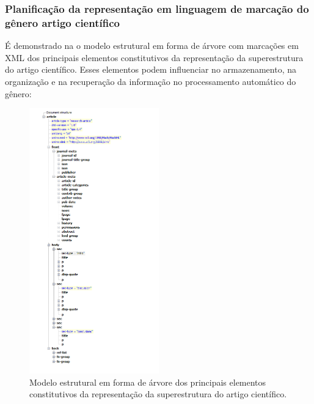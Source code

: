 \documentclass[portuguese]{textolivre}
\begin{document}
\subsubsection{Planificação da representação em linguagem de marcação do gênero artigo científico}\label{sec-organizacao-latex}
É demonstrado na  o modelo estrutural em forma de árvore com marcações em XML dos principais elementos constitutivos da representação da superestrutura do artigo científico. Esses elementos podem influenciar no armazenamento, na organização e na recuperação da informação no processamento automático do gênero:

\begin{figure}[htbp]
 \centering
 \includegraphics[width=0.5\textwidth]{Fig3.png}
 \caption{Modelo estrutural em forma de árvore dos principais elementos constitutivos da representação da superestrutura do artigo científico.}
 \label{fig-03}
\end{figure}
\end{document}
